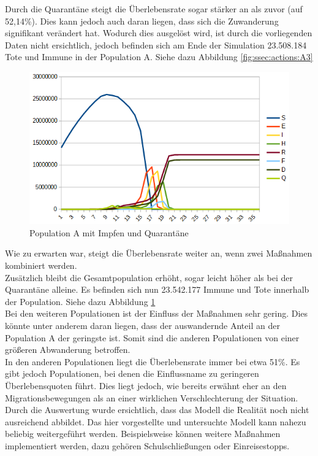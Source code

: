   Durch die Quarantäne steigt die Überlebensrate sogar stärker an als zuvor (auf 52,14\%). Dies kann jedoch auch daran liegen, dass sich die Zuwanderung signifikant verändert hat. Wodurch dies ausgelöst wird, ist durch die vorliegenden Daten nicht ersichtlich, jedoch befinden sich am Ende der Simulation 23.508.184 Tote und Immune in der Population A. Siehe dazu Abbildung \ref{fig:ssec:actions:A3}\\
 \begin{figure}
 \includegraphics[width=1\textwidth]{massnahmen/A4}
\caption{Population A mit Impfen und Quarantäne}
\label{fig:ssec:actions:A4}
\end{figure}
  Wie zu erwarten war, steigt die Überlebensrate weiter an, wenn zwei Maßnahmen kombiniert werden.\\
  Zusätzlich bleibt die Gesamtpopulation erhöht, sogar leicht höher als bei der Quarantäne alleine. Es befinden sich nun 23.542.177 Immune und Tote innerhalb der Population. Siehe dazu Abbildung \ref{fig:ssec:actions:A4}\\
   Bei den weiteren Populationen ist der Einfluss der Maßnahmen sehr gering. Dies könnte unter anderem daran liegen, dass der auswandernde Anteil an der Population A der geringste ist. Somit sind die anderen Populationen von einer größeren Abwanderung betroffen.\\
   In den anderen Populationen liegt die Überlebensrate immer bei etwa 51\%. Es gibt jedoch Populationen, bei denen die Einflussname zu geringeren Überlebensquoten führt. Dies liegt jedoch, wie bereits erwähnt eher an den Migrationsbewegungen als an einer wirklichen Verschlechterung der Situation.\\
   Durch die Auswertung wurde ersichtlich, dass das Modell die Realität noch nicht ausreichend abbildet. Das hier vorgestellte und untersuchte Modell kann nahezu beliebig weitergeführt werden. Beispielsweise können weitere Maßnahmen implementiert werden, dazu gehören Schulschließungen oder Einreisestopps.\\

